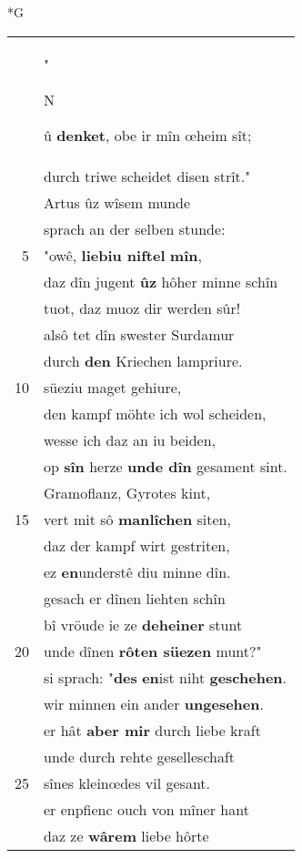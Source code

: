 \documentclass[8pt,a4paper,notitlepage]{article}
\begin{document}
\begin{table}[ht]
\begin{minipage}[t]{0.5\linewidth}
\small
\begin{center}*G
\end{center}
\begin{tabular}{rl}
 & "\begin{large}N\end{large}û \textbf{denket}, obe ir mîn œheim sît;\\ 
 & durch triwe scheidet disen strît."\\ 
 & Artus ûz wîsem munde\\ 
 & sprach an der selben stunde:\\ 
5 & "owê, \textbf{liebiu niftel} \textbf{mîn},\\ 
 & daz dîn jugent \textbf{ûz} hôher minne schîn\\ 
 & tuot, daz muoz dir werden sûr!\\ 
 & alsô tet dîn swester Surdamur\\ 
 & durch \textbf{den} Kriechen lampriure.\\ 
10 & süeziu maget gehiure,\\ 
 & den kampf möhte ich wol scheiden,\\ 
 & wesse ich daz an iu beiden,\\ 
 & op \textbf{sîn} herze \textbf{unde dîn} gesament sint.\\ 
 & Gramoflanz, Gyrotes kint,\\ 
15 & vert mit sô \textbf{manlîchen} siten,\\ 
 & daz der kampf wirt gestriten,\\ 
 & ez \textbf{en}understê diu minne dîn.\\ 
 & gesach er dînen liehten schîn\\ 
 & bî vröude ie ze \textbf{deheiner} stunt\\ 
20 & unde dînen \textbf{rôten süezen} munt?"\\ 
 & si sprach: "\textbf{des} \textbf{en}ist niht \textbf{geschehen}.\\ 
 & wir minnen ein ander \textbf{ungesehen}.\\ 
 & er hât \textbf{aber mir} durch liebe kraft\\ 
 & unde durch rehte geselleschaft\\ 
25 & sînes kleinœdes vil gesant.\\ 
 & er enpfienc ouch von mîner hant\\ 
 & daz ze \textbf{wârem} liebe hôrte\\ 

\end{tabular}
\end{minipage}
\end{table}
\end{document}
